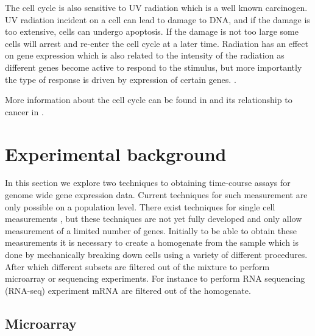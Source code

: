 The cell cycle is also sensitive to UV radiation which is a well known carcinogen. UV radiation incident on a cell can lead to damage to DNA, and if the damage is too extensive, cells can undergo apoptosis. If the damage is not too large some cells will arrest and re-enter the cell cycle at a later time. Radiation has an effect on gene expression which is also related to the intensity of the radiation as different genes become active to respond to the stimulus, but more importantly the type of response is driven by expression of certain genes. \citep{Gentile:2003in}.

More information about the cell cycle can be found in \citet[Chapter~17]{Alberts:2007tv} and its relationship to cancer in \citet[Chapter~8]{Weinberg:2013uu}.


\section{Experimental background}
\label{sec:exper-backgr}

In this section we explore two techniques to obtaining time-course assays for genome wide gene expression data. Current techniques for such measurement are only possible on a population level. There exist techniques for single cell measurements \citep{Buganim:2012hp}, but these techniques are not yet fully developed and only allow measurement of a limited number of genes. Initially to be able to obtain these measurements it is necessary to create a homogenate from the sample which is done by mechanically breaking down cells using a variety of different procedures.  After which different subsets are filtered out of the mixture to perform microarray or sequencing experiments.  For instance to perform RNA sequencing (RNA-seq) experiment mRNA are filtered out of the homogenate.

\subsection{Microarray}
\label{sec:microarray}

